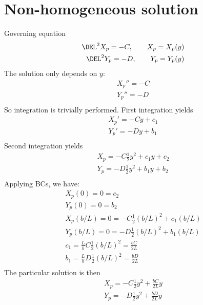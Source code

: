 \documentclass[11pt]{article}
\begin{document}
\section{Non-homogeneous solution}
Governing equation
\begin{equation}\begin{aligned}
\DEL^2 X_p = -C, \qquad X_p = X_p(y) \\
\DEL^2 Y_p = -D, \qquad Y_p = Y_p(y) \\
\end{aligned} \end{equation}
The solution only depends on $y$:
\begin{equation}\begin{aligned}
X_p'' = -C \\
Y_p'' = -D \\
\end{aligned} \end{equation}
So integration is trivially performed. First integration yields
\begin{equation}\begin{aligned}
X_p' = -C y + c_1 \\
Y_p' = -D y + b_1 \\
\end{aligned} \end{equation}
Second integration yields
\begin{equation}\begin{aligned}
X_p = -C \frac{1}{2} y^2 + c_1 y + c_2 \\
Y_p = -D \frac{1}{2} y^2 + b_1 y + b_2 \\
\end{aligned} \end{equation}
Applying BCs, we have:
\begin{equation}\begin{aligned}
X_p(0) = 0 = c_2 \\
Y_p(0) = 0 = b_2 \\
X_p(b/L) = 0 = -C \frac{1}{2} (b/L)^2 + c_1 (b/L) \\
Y_p(b/L) = 0 = -D \frac{1}{2} (b/L)^2 + b_1 (b/L) \\
c_1 = \frac{L}{b} C \frac{1}{2} (b/L)^2 = \frac{b C}{2L} \\
b_1 = \frac{L}{b} D \frac{1}{2} (b/L)^2 = \frac{b D}{2L} \\
\end{aligned} \end{equation}
The particular solution is then
\begin{equation}\begin{aligned}
X_p = -C \frac{1}{2} y^2 + \frac{b C}{2L} y \\
Y_p = -D \frac{1}{2} y^2 + \frac{b D}{2L} y \\
\end{aligned} \end{equation}
\end{document}
